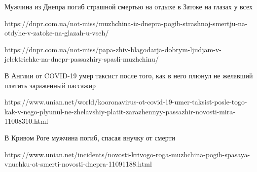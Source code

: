 
Мужчина из Днепра погиб страшной смертью на отдыхе в Затоке на глазах у всех

https://dnpr.com.ua/not-miss/muzhchina-iz-dnepra-pogib-strashnoj-smertju-na-otdyhe-v-zatoke-na-glazah-u-vseh/

https://dnpr.com.ua/not-miss/papa-zhiv-blagodarja-dobrym-ljudjam-v-jelektrichke-na-dnepr-passazhiry-spasli-muzhchinu/

В Англии от COVID-19 умер таксист после того, как в него плюнул не желавший платить зараженный пассажир

https://www.unian.net/world/kooronavirus-ot-covid-19-umer-taksist-posle-togo-kak-v-nego-plyunul-ne-zhelavshiy-platit-zarazhennyy-passazhir-novosti-mira-11008310.html

В Кривом Роге мужчина погиб, спасая внучку от смерти

https://www.unian.net/incidents/novosti-krivogo-roga-muzhchina-pogib-spasaya-vnuchku-ot-smerti-novosti-dnepra-11091188.html
